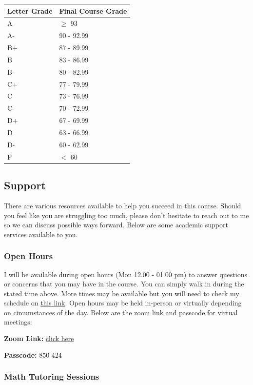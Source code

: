 \documentclass[
  letterpaper,
  DIV=11,
  numbers=noendperiod]{scrartcl}
\begin{document}
\begin{longtable}[]{@{}ll@{}}
\toprule\noalign{}
Letter Grade & Final Course Grade \\
\midrule\noalign{}
\endhead
\bottomrule\noalign{}
\endlastfoot
A & \(\ge\) 93 \\
A- & 90 - 92.99 \\
B+ & 87 - 89.99 \\
B & 83 - 86.99 \\
B- & 80 - 82.99 \\
C+ & 77 - 79.99 \\
C & 73 - 76.99 \\
C- & 70 - 72.99 \\
D+ & 67 - 69.99 \\
D & 63 - 66.99 \\
D- & 60 - 62.99 \\
F & \(<\) 60 \\
\end{longtable}

\subsection{Support}\label{support}

There are various resources available to help you succeed in this
course. Should you feel like you are struggling too much, please don't
hesitate to reach out to me so we can discuss possible ways forward.
Below are some academic support services available to you.

\subsubsection{Open Hours}\label{open-hours}

I will be available during open hours (Mon 12.00 - 01.00 pm) to answer
questions or concerns that you may have in the course. You can simply
walk in during the stated time above. More times may be available but
you will need to check my schedule on
\href{https://calendly.com/jmochogi/20min?month=2024-08}{this link}.
Open hours may be held in-person or virtually depending on circumstances
of the day. Below are the zoom link and passcode for virtual meetings:

\textbf{Zoom Link:}
\href{https://ithaca.zoom.us/j/3364817575?pwd=WlA1S3hJWWZNTTFoWUVaZlA1clhtdz09}{click
here}

\textbf{Passcode:} 850 424

\subsubsection{Math Tutoring Sessions}\label{math-tutoring-sessions}
\end{document}
